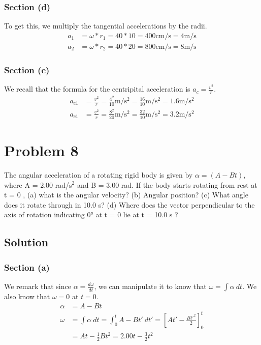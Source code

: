 \documentclass[12pt]{article}
\begin{document}
\subsubsection*{Section (d)}
To get this, we multiply the tangential accelerations by the radii. 
\begin{align*}
    a_1 &=  \omega * r_1 = 40 * 10 = 400\unit{\centi\meter/\second} = \boxed{4 \unit{\meter/\second}}\\
    a_2 &=  \omega * r_2 = 40 * 20 = 800\unit{\centi\meter/\second} = \boxed{8 \unit{\meter/\second}}
\end{align*}

\subsubsection*{Section (e)}
We recall that the formula for the centripital acceleration is $a_c = \frac{v^2}{r}$. 
\begin{align*}
    a_{c1}  &=  \frac{v^2}{r} = \frac{4^2}{10}\unit{\meter/\second^2} = \frac{16}{10}\unit{\meter/\second^2} = \boxed{1.6 \unit{\meter/\second^2}}\\
    a_{c1}  &=  \frac{v^2}{r} = \frac{8^2}{20}\unit{\meter/\second^2} = \frac{32}{10}\unit{\meter/\second^2} = \boxed{3.2 \unit{\meter/\second^2}}
\end{align*}


\pagebreak
\section*{Problem 8}
The angular acceleration of a rotating rigid body is given by $\alpha = (A - Bt)$, where A =
2.00 rad/s$^2$ and B = 3.00 rad. If the body starts rotating from rest at t = 0 , (a) what is the angular
velocity? (b) Angular position? (c) What angle does it rotate through in 10.0 s? (d) Where does
the vector perpendicular to the axis of rotation indicating 0\unit{\degree} at t = 0 lie at t = 10.0 s ?

\subsection*{Solution}
\subsubsection*{Section (a)}
We remark that since $\alpha = \frac{d\omega}{dt}$, we can manipulate it to know that $\omega = \int \alpha\ dt$. We also know that $\omega = 0$ at $t = 0$.
\begin{align*}
    \alpha  &=  A - Bt\\
    \omega  &=  \int \alpha\ dt
            =   \int_{0}^{t} A - Bt'\ dt'
            =   \left[At' - \frac{Bt'^2}{2}\right]_0^t\\
            &=  At - \frac{1}{2}Bt^2
            =   \boxed{2.00t - \frac{3}{2}t^2}
\end{align*}
\end{document}
